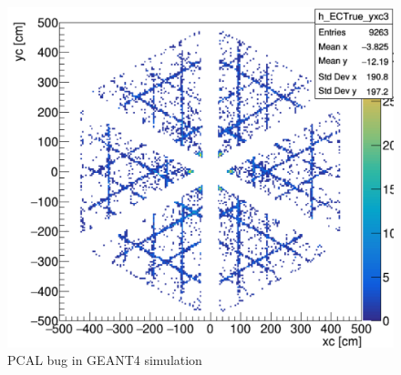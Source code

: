 \begin{figure}[hbt]
	\centering
	\includegraphics[width=1.0\columnwidth,keepaspectratio]{img/PCAL_bug_hls.png}
	\caption{PCAL bug in GEANT4 simulation}
	\label{fig:PCAL_bug_hls}
\end{figure}

